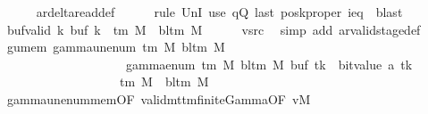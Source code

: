 \begin{isabellebody}
\ \ \ \ \isamarkupfalse%
\ ar{\isacharunderscore}{\kern0pt}delta{\isacharunderscore}{\kern0pt}read{\isacharunderscore}{\kern0pt}def\isanewline
\ \ \ \ \isamarkupfalse%
\ {\isacharparenleft}{\kern0pt}rule\ UnI{}{\isacharparenright}{\kern0pt}\ {\isacharparenleft}{\kern0pt}use\ qQ\ last\ posk{\isacharunderscore}{\kern0pt}proper\ ieq\ \ blast{\isacharparenright}{\kern0pt}\isanewline
\ \ \isamarkupfalse%
\ buf{\isacharunderscore}{\kern0pt}valid{\isacharcolon}{\kern0pt}\ {\isachardoublequoteopen}{\isasymforall}k{\isachardot}{\kern0pt}\ buf\ k\ {\isasymin}\ {\isasymGamma}{\isacharunderscore}{\kern0pt}tm\ M\ {\isasymunion}\ {\isacharbraceleft}{\kern0pt}bl{\isacharunderscore}{\kern0pt}tm\ M{\isacharbraceright}{\kern0pt}{\isachardoublequoteclose}\isanewline
\ \ \ \ \isamarkupfalse%
\ vsrc\ \isamarkupfalse%
\ {\isacharparenleft}{\kern0pt}simp\ add{\isacharcolon}{\kern0pt}\ ar{\isacharunderscore}{\kern0pt}valid{\isacharunderscore}{\kern0pt}stage{\isacharunderscore}{\kern0pt}def{\isacharparenright}{\kern0pt}\isanewline
\ \ \isamarkupfalse%
\ gu{\isacharunderscore}{\kern0pt}mem{\isacharcolon}{\kern0pt}\ {\isachardoublequoteopen}gamma{\isacharunderscore}{\kern0pt}unenum\ {\isacharparenleft}{\kern0pt}{\isasymGamma}{\isacharunderscore}{\kern0pt}tm\ M{\isacharparenright}{\kern0pt}\ {\isacharparenleft}{\kern0pt}bl{\isacharunderscore}{\kern0pt}tm\ M{\isacharparenright}{\kern0pt}\isanewline
\ \ \ \ \ \ \ \ \ \ \ \ \ \ \ \ \ \ {\isacharparenleft}{\kern0pt}{}\ {\isacharasterisk}{\kern0pt}\ gamma{\isacharunderscore}{\kern0pt}enum\ {\isacharparenleft}{\kern0pt}{\isasymGamma}{\isacharunderscore}{\kern0pt}tm\ M{\isacharparenright}{\kern0pt}\ {\isacharparenleft}{\kern0pt}bl{\isacharunderscore}{\kern0pt}tm\ M{\isacharparenright}{\kern0pt}\ {\isacharparenleft}{\kern0pt}buf\ tk{\isacharparenright}{\kern0pt}\ {\isacharplus}{\kern0pt}\ bit{\isacharunderscore}{\kern0pt}value\ {\isacharparenleft}{\kern0pt}{\isacharquery}{\kern0pt}a\ tk{\isacharparenright}{\kern0pt}{\isacharparenright}{\kern0pt}\isanewline
\ \ \ \ \ \ \ \ \ \ \ \ \ \ \ \ \ \ {\isasymin}\ {\isasymGamma}{\isacharunderscore}{\kern0pt}tm\ M\ {\isasymunion}\ {\isacharbraceleft}{\kern0pt}bl{\isacharunderscore}{\kern0pt}tm\ M{\isacharbraceright}{\kern0pt}{\isachardoublequoteclose}\isanewline
\ \ \ \ \isamarkupfalse%
\ gamma{\isacharunderscore}{\kern0pt}unenum{\isacharunderscore}{\kern0pt}mem{\isacharbrackleft}{\kern0pt}OF\ valid{\isacharunderscore}{\kern0pt}mttm{\isacharunderscore}{\kern0pt}finite{\isacharunderscore}{\kern0pt}Gamma{\isacharbrackleft}{\kern0pt}OF\ vM{\isacharbrackright}{\kern0pt}{\isacharbrackright}{\kern0pt}\ \isakeywordONE{{\isachardot}{\kern0pt}}\isamarkupfalse%

\end{isabellebody}
